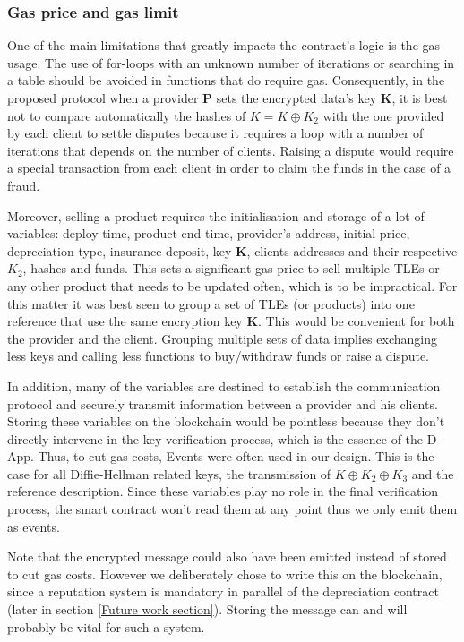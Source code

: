 \documentclass[conference]{IEEEtran}
\begin{document}
\subsubsection{Gas price and gas limit}
One of the main limitations that greatly impacts the contract's logic is the gas usage. The use of for-loops with an unknown number of iterations or searching in a table should be avoided in functions that do require gas. Consequently, in the proposed protocol when a provider \textbf{P} sets the encrypted data's key \textbf{K}, it is best not to compare automatically the hashes of $ K = K \oplus K_2$ with the one provided by each client to settle disputes because it requires a loop with a number of iterations that depends on the number of clients. Raising a dispute would require a special transaction from each client in order to claim the funds in the case of a fraud.

Moreover, selling a product requires the initialisation and storage of a lot of variables: deploy time, product end time, provider's address, initial price, depreciation type, insurance deposit, key \textbf{K}, clients addresses and their respective \textbf{$K_2$}, hashes and funds. This sets a significant gas price to sell multiple TLEs or any other product that needs to be updated often, which is to be impractical. For this matter it was best seen to group a set of TLEs (or products) into one reference that use the same encryption key \textbf{K}. This would be convenient for both the provider and the client. Grouping multiple sets of data implies exchanging less keys and calling less functions to buy/withdraw funds or raise a dispute.


In addition, many of the variables are destined to establish the communication protocol and securely transmit information between a provider and his clients. Storing these variables on the blockchain would be pointless because they don't directly intervene in the key verification process, which is the essence of the D-App. Thus, to cut gas costs, Events were often used in our design. This is the case for all Diffie-Hellman related keys, the transmission of $K \oplus K_2 \oplus K_3$ and the reference description. Since these variables play no role in the final verification process, the smart contract won't read them at any point thus we only emit them as events.

Note that the encrypted message could also have been emitted instead of stored to cut gas costs. However we deliberately chose to write this on the blockchain, since a reputation system is mandatory in parallel of the depreciation contract (later in section \ref{Future work section}). Storing the message can and will probably be vital for such a system.
\end{document}
